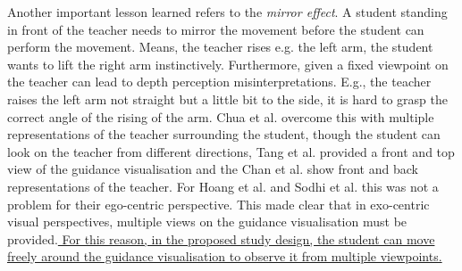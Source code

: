 Another important lesson learned refers to the \textit{mirror effect}. A student standing in front of the teacher needs to mirror the movement before the student can perform the movement. Means, the teacher rises e.g. the left arm, the student wants to lift the right arm instinctively. Furthermore, given a fixed viewpoint on the teacher can lead to depth perception misinterpretations. E.g., the teacher raises the left arm not straight but a little bit to the side, it is hard to grasp the correct angle of the rising of the arm. Chua et al. overcome this with multiple representations of the teacher surrounding the student, though the student can look on the teacher from different directions, Tang et al. provided a front and top view of the guidance visualisation and the Chan et al. show front and back representations of the teacher. For Hoang et al. and Sodhi et al. this was not a problem for their ego-centric perspective. This made clear that in exo-centric visual perspectives, multiple views on the guidance visualisation must be provided.\ul{ For this reason, in the proposed study design, the student can move freely around the guidance visualisation to observe it from multiple viewpoints.}


